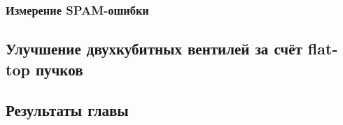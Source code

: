
\subsubsection{Измерение SPAM-ошибки}

\subsection{Улучшение двухкубитных вентилей за счёт flat-top пучков}

\subsection{Результаты главы}


\newpage